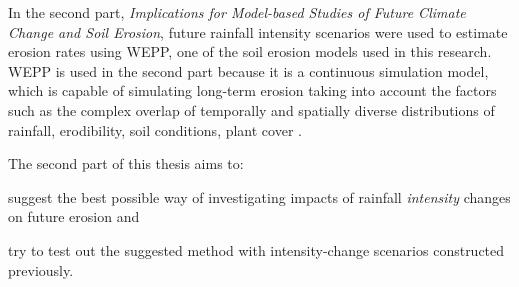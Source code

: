 In the second part, \textsl{Implications for Model-based Studies of Future
Climate Change and Soil Erosion}, future rainfall intensity scenarios
were used to estimate erosion rates using WEPP, one of the soil
erosion models used in this research. WEPP is used in the second part because it
is a continuous simulation model, which is capable of simulating long-term
erosion taking into account the factors such as the complex overlap of
temporally and spatially diverse distributions of rainfall, erodibility, soil
conditions, plant cover \citep{nearing2006-145}.

The second part of this thesis aims to:
\begin{itemize*}
  \item suggest the best possible way of investigating impacts of rainfall
\textit{intensity} changes on future erosion and
  \item try to test out the suggested method with intensity-change scenarios
constructed previously.
\end{itemize*}


